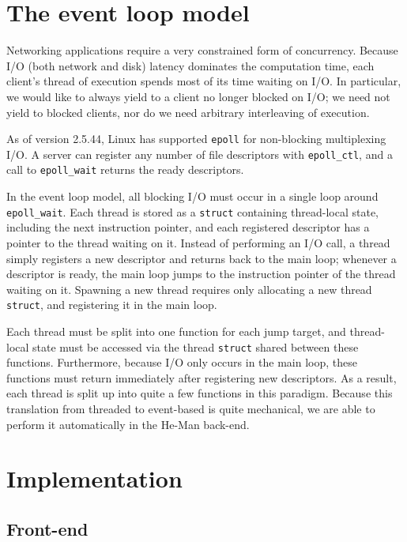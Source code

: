 \documentclass[preprint,11pt]{sigplanconf}
\renewcommand{\t}{\texttt}
\begin{document}
\section{The event loop model}

Networking applications require a very constrained form of concurrency. Because
I/O (both network and disk) latency dominates the computation time, each
client's thread of execution spends most of its time waiting on I/O. In
particular, we would like to always yield to a client no longer blocked on I/O;
we need not yield to blocked clients, nor do we need arbitrary interleaving of
execution.

As of version 2.5.44, Linux has supported \t{epoll} for non-blocking
multiplexing I/O. A server can register any number of file descriptors with
\t{epoll\_ctl}, and a call to \t{epoll\_wait} returns the ready descriptors. 

In the event loop model, all blocking I/O must occur in a single loop around
\t{epoll\_wait}. Each thread is stored as a \t{struct} containing thread-local
state, including the next instruction pointer, and each registered descriptor
has a pointer to the thread waiting on it. Instead of performing an I/O call, a
thread simply registers a new descriptor and returns back to the main loop;
whenever a descriptor is ready, the main loop jumps to the instruction pointer
of the thread waiting on it. Spawning a new thread requires only allocating a
new thread \t{struct}, and registering it in the main loop.

Each thread must be split into one function for each jump target, and
thread-local state must be accessed via the thread \t{struct} shared between
these functions. Furthermore, because I/O only occurs in the main loop, these
functions must return immediately after registering new descriptors. As a
result, each thread is split up into quite a few functions in this paradigm.
Because this translation from threaded to event-based is quite mechanical, we
are able to perform it automatically in the He-Man back-end.

\section{Implementation}

\subsection{Front-end}
\end{document}
